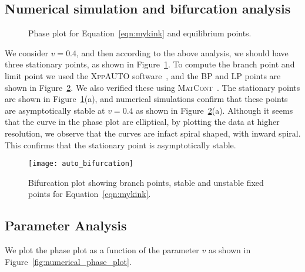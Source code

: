 \documentclass{article}[12pt]
\theoremstyle{plain}
\begin{document}
\subsection{Numerical simulation and bifurcation analysis}
\begin{figure}[htb]
\begin{center}
\caption{Phase plot for Equation~\ref{eqn:mykink} and equilibrium points.}
\label{fig:phase-pplan}
\end{center}
\end{figure}

We consider $v=0.4$, and then according to the above analysis, we should have three stationary points, as shown in
Figure~\ref{fig:phase-pplan}.
To compute the branch point and limit point we used the \textsc{XppAUTO} software~\cite{autobook}, and the BP and LP
points are shown in Figure~\ref{fig:bpa}. We also verified these using \textsc{MatCont}~\cite{matcont}.
The  stationary points are shown in Figure~\ref{fig:phase-pplan}(a), and numerical simulations confirm that
these points are asymptotically stable at $v=0.4$ as shown in Figure~\ref{fig:bpa}(a).
Although it seems that the curve in the phase plot are elliptical, by plotting the data at higher resolution, we observe that the
curves are infact spiral shaped, with inward spiral. This confirms that the stationary point is asymptotically stable. 

\begin{figure}[htb]
\begin{center}
\texttt{[image: auto\_bifurcation]}
\caption{Bifurcation plot showing branch points, stable and unstable fixed points for Equation~\ref{eqn:mykink}.}
\label{fig:bpa}
\end{center}
\end{figure}


\subsection{Parameter Analysis}
We plot the phase plot as a function of the parameter $v$ as shown in Figure~\ref{fig:numerical_phase_plot}.
\end{document}
